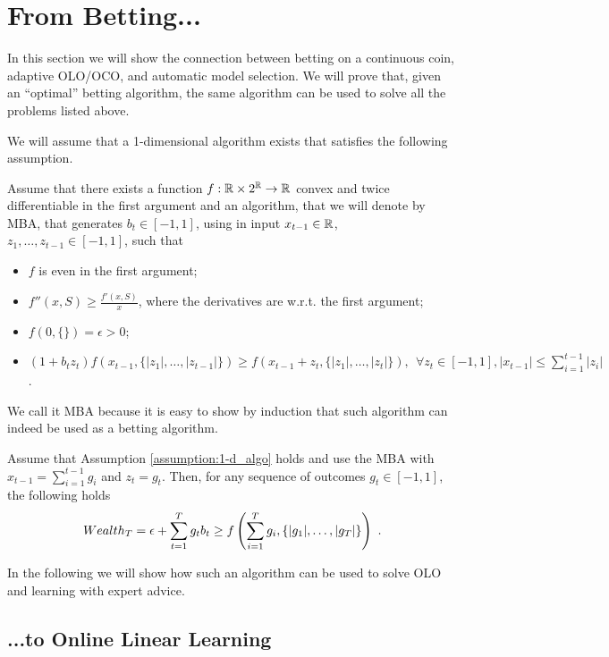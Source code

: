 \section{From Betting...}

In this section we will show the connection between betting on a continuous coin, adaptive \ac{OLO}/\ac{OCO}, and automatic model selection. We will prove that, given an ``optimal'' betting algorithm, the same algorithm can be used to solve all the problems listed above.

We will assume that a 1-dimensional algorithm exists that satisfies the following assumption.
\begin{assumption}
\label{assumption:1-d_algo}
Assume that there exists a function $f:\mathbb{R} \times 2^{\mathbb{R}} \rightarrow \mathbb{R}$ convex and twice differentiable in the first argument and an algorithm, that we will denote by \ac{MBA}, that generates $b_t \in [-1 , 1]$, using in input $x_{t-1} \in \mathbb{R}$, $z_1, \ldots, z_{t-1} \in [-1,1]$, such that
\begin{itemize}
\item $f$ is even in the first argument;
\item $f''(x, S) \geq \frac{f'(x,S)}{x}$, where the derivatives are w.r.t. the first argument;
\item $f(0,\{\})=\epsilon>0$;
\item  $
(1+b_t z_t) f\left( x_{t-1}, \{|z_1|, \ldots, |z_{t-1}|\} \right) \geq f\left( x_{t-1}+z_t, \{|z_1|, \ldots, |z_t|\}\right), \ \ \forall z_{t} \in [-1,1], |x_{t-1}| \leq \sum_{i=1}^{t-1} |z_i|
$.
\end{itemize}
\end{assumption}

We call it \ac{MBA} because it is easy to show by induction that such algorithm can indeed be used as a betting algorithm.
\begin{theorem}
\label{theo:1-d_reward}
Assume that Assumption \ref{assumption:1-d_algo} holds and use the \ac{MBA} with $x_{t-1}=\sum_{i=1}^{t-1} g_i$ and $z_t=g_t$.
Then, for any sequence of outcomes $g_t \in [-1,1]$, the following holds
\[
Wealth_T = \epsilon+\sum_{t=1}^T g_t b_t \geq f\left( \sum_{i=1}^{T} g_i , \left\{|g_1|, \ldots, |g_T|\right\}\right)~.
\]
\end{theorem}

In the following we will show how such an algorithm can be used to solve \ac{OLO} and learning with expert advice.

\subsection{...to Online Linear Learning}

